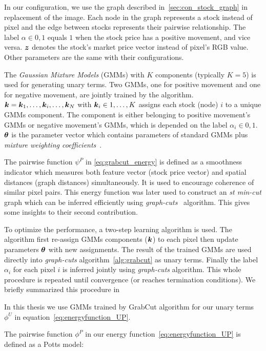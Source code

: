 In our configuration, we use the graph described
in~\ref{sec:con_stock_graph} in replacement of the image. Each
node in the graph represents a stock instead of pixel and the
edge between stocks represents their pairwise relationship. The
label $\alpha \in {0,1}$ equals $1$ when the stock price has a
positive movement, and vice versa. ${\boldsymbol{z}}$ denotes the stock's
market price vector instead of pixel's RGB value. Other
parameters are the same with their configurations.

The \emph{Gaussian Mixture Models} (GMMs) with $K$ components
(typically $K=5$) is used for generating unary terms. Two GMMs,
one for positive movement and one for negative movement, are
jointly trained by the algorithm.
${\boldsymbol{k}}={{\boldsymbol{k}}_1,\dots,{\boldsymbol{k}}_i,\dots,{\boldsymbol{k}}_N}$ with ${\boldsymbol{k}}_i\in 1,\dots,K$
assigns each stock (node) $i$ to a unique GMMs component. The
component is either belonging to positive movement's GMMs or
negative movement's GMMs, which is depended on the label
$\alpha_i\in {0,1}$. $\boldsymbol{\theta}$ is the parameter vector which
contains parameters of standard GMMs plus \emph{mixture weighting
  coefficients}~\cite{Rother:SIGGRAPH04}.

The pairwise function $\psi^P$ in \eqref{eq:grabcut_energy} is
defined as a smoothness indicator which measures both feature
vector (stock price vector) and spatial distances (graph
distances) simultaneously. It is used to encourage coherence of
similar pixel pairs. This energy function was later used to
construct an \emph{st min-cut} graph which can be inferred
efficiently using \emph{graph-cuts}~\cite{Boykov:ICCV01}
algorithm. This gives some insights to their second contribution.

To optimize the performance, a two-step learning algorithm is
used. The algorithm first re-assign GMMs components (${\boldsymbol{k}}$) to
each pixel then update parameters $\boldsymbol{\theta}$ with new assignments.
The result of the trained GMMs are used directly into
\emph{graph-cuts} algorithm~\ref{alg:grabcut} as unary terms.
Finally the label $\alpha_i$ for each pixel $i$ is inferred
jointly using \emph{graph-cuts} algorithm. This whole procedure
is repeated until convergence (or reaches termination
conditions). We briefly summarized this procedure in

In this thesis we use GMMs trained by GrabCut algorithm for our
unary terms $\phi^U$ in equation~\eqref{eq:energyfunction_UP}.

The pairwise function $\phi^P$ in our energy
function~\eqref{eq:energyfunction_UP} is defined as a Potts
model:

